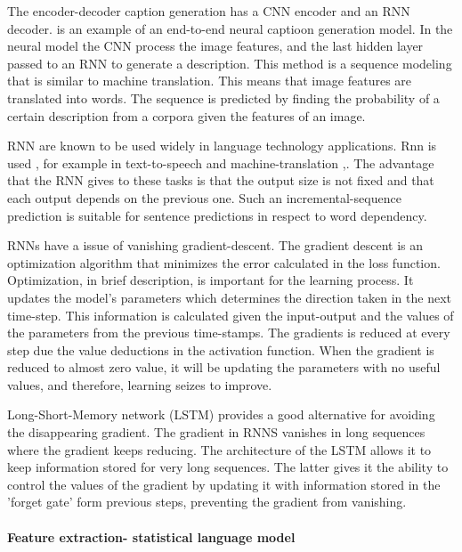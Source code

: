 The encoder-decoder caption generation has a CNN encoder and an RNN decoder.\cite{vinyals2015tell} is an example of an end-to-end neural captioon generation model. In the neural model the CNN process the image features, and the last hidden layer passed to an RNN to generate a description. This method is a sequence modeling that is similar to machine translation. This means that image features are translated into words. The sequence is predicted by finding the probability of a certain description from a corpora given the features of an image. 

RNN are known to be used widely in language technology applications. Rnn is used , for example in  text-to-speech \cite{arik2017deep} and  machine-translation \cite{cho2014learning},\cite{Wu2016GooglesNM}. The advantage that the RNN gives to these tasks is that the output size is not fixed and that each output depends on the previous one. Such an incremental-sequence prediction is suitable for sentence predictions in respect to word dependency.  

RNNs have a issue of vanishing gradient-descent. The gradient descent is an optimization algorithm that minimizes the error calculated in the loss function. Optimization, in brief description, is important for the learning process. It updates the model's parameters which determines the  direction taken in the next time-step. This information is calculated given the input-output and the values of the parameters from the previous time-stamps. The gradients is reduced at every step due the value deductions in the activation function. When the gradient is reduced to almost zero value, it will be updating the parameters with no useful values, and therefore, learning seizes to improve. 

Long-Short-Memory network (LSTM)  provides a good alternative for avoiding the disappearing gradient. The gradient in RNNS vanishes in long sequences where the gradient keeps reducing. The architecture of the LSTM allows it to keep information stored for very long sequences. The latter gives it the ability to control the values of the gradient by updating it with information stored in the 'forget gate' form previous steps, preventing the gradient from vanishing.  



\paragraph{Feature extraction- statistical language model}

